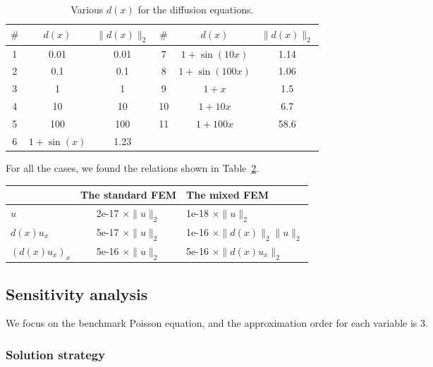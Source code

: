 \documentclass[review,3p]{elsarticle}
\begin{document}
\begin{table}[!ht]
\centering
\caption [w]{Various $d(x)$ for the diffusion equations.} 
\label{d_diffusion_equations}
 \begin{tabular}{c c c c c c} \hline
$\#$ &$d(x)$ & $\|d(x)\|_2$ & $\#$ &$d(x)$ & $\|d(x)\|_2$ \\ \hline
1 & 0.01 & 0.01 & 7 & $1+\sin(10x)$ & 1.14 \\ \hline
2 & 0.1 & 0.1 & 8 & $1+\sin(100x)$ & 1.06 \\ \hline
3 & 1 & 1 & 9 & $1+x$ & 1.5 \\ \hline
4 & 10 & 10 & 10 & $1+10x$ & 6.7 \\ \hline
5 & 100 & 100 & 11& $1+100x$ & 58.6 \\ \hline
6 & $1+\sin(x)$ & 1.23 & & &  \\ \hline
\end{tabular}
\end{table}

\newpage
For all the cases, we found the relations shown in Table~\ref{relation_alpha_R_l2_norm_u_du}.

\begin{table}[!ht]
\centering
\begin{tabular}{l c l}
\hline
 & The standard FEM & The mixed FEM \\ \hline 
$u$ & 2e-17 $\times \|u\|_2$ & 1e-18 $\times \|u\|_2$ \\ \hline 
$d(x)u_x$ & 5e-17 $\times \|u\|_2$ & 1e-16 $\times \|d(x)\|_2 \|u\|_2$ \\ \hline
$(d(x)u_x)_x$ & 5e-16 $\times \|u\|_2$ & 5e-16 $\times \|d(x)u_x\|_2$ \\ \hline
\end{tabular}
\label{relation_alpha_R_l2_norm_u_du}
\end{table}


\newpage
\subsection{Sensitivity analysis}       \label{section_sensitivity}


We focus on the benchmark Poisson equation, and the approximation order for each variable is 3.


\subsubsection{Solution strategy}		\label{section_solver}
\end{document}
